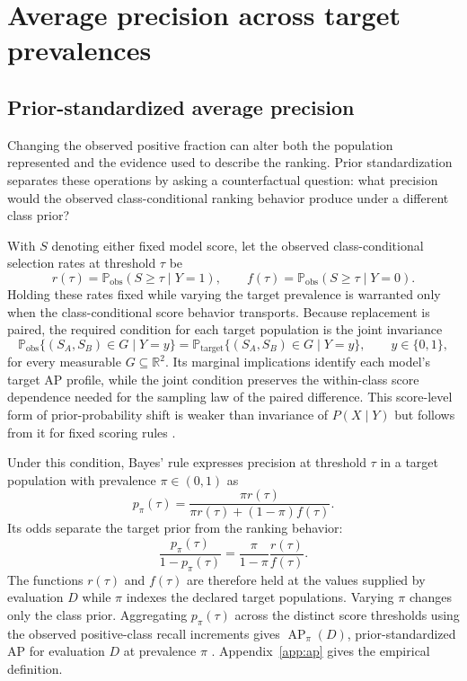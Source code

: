 \documentclass[11pt]{article}
\newcommand{\AP}{\operatorname{AP}}
\newcommand{\Prb}{\mathbb{P}}
\theoremstyle{remark}
\begin{document}
\section{Average precision across target prevalences}
\label{sec:prevalence}

\subsection{Prior-standardized average precision}

Changing the observed positive fraction can alter both the population represented and the evidence used to describe the ranking. Prior standardization separates these operations by asking a counterfactual question: what precision would the observed class-conditional ranking behavior produce under a different class prior?

With $S$ denoting either fixed model score, let the observed class-conditional selection rates at threshold $\tau$ be
\[
r(\tau)=\Prb_{\mathrm{obs}}(S\geq \tau\mid Y=1),
\qquad
f(\tau)=\Prb_{\mathrm{obs}}(S\geq \tau\mid Y=0).
\]
Holding these rates fixed while varying the target prevalence is warranted only when the class-conditional score behavior transports. Because replacement is paired, the required condition for each target population is the joint invariance
\begin{equation}
\Prb_{\mathrm{obs}}\{(S_A,S_B)\in G\mid Y=y\}
=
\Prb_{\mathrm{target}}\{(S_A,S_B)\in G\mid Y=y\},
\qquad y\in\{0,1\},
\label{eq:score-invariance}
\end{equation}
for every measurable $G\subseteq\mathbb R^2$. Its marginal implications identify each model's target AP profile, while the joint condition preserves the within-class score dependence needed for the sampling law of the paired difference. This score-level form of prior-probability shift is weaker than invariance of $P(X\mid Y)$ but follows from it for fixed scoring rules \cite{saerens2002adjusting,storkey2009training,lipton2018detecting}.

Under this condition, Bayes' rule expresses precision at threshold $\tau$ in a target population with prevalence $\pi\in(0,1)$ as
\begin{equation}
p_\pi(\tau)
=
\frac{\pi r(\tau)}
{\pi r(\tau)+(1-\pi)f(\tau)}.
\label{eq:reference-precision}
\end{equation}
Its odds separate the target prior from the ranking behavior:
\begin{equation}
\frac{p_\pi(\tau)}{1-p_\pi(\tau)}
=
\frac{\pi}{1-\pi}\frac{r(\tau)}{f(\tau)}.
\label{eq:precision-odds}
\end{equation}
The functions $r(\tau)$ and $f(\tau)$ are therefore held at the values supplied by evaluation $D$ while $\pi$ indexes the declared target populations. Varying $\pi$ changes only the class prior. Aggregating $p_\pi(\tau)$ across the distinct score thresholds using the observed positive-class recall increments gives $\AP_\pi(D)$, prior-standardized AP for evaluation $D$ at prevalence $\pi$ \cite{elkan2001foundations,siblini2020calibration}. Appendix~\ref{app:ap} gives the empirical definition.
\end{document}
